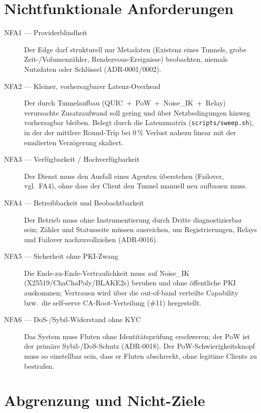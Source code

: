 \section{Nichtfunktionale Anforderungen}\label{sec:nichtfunktionale-anforderungen}

\begin{description}
  \item[NFA1 --- Providerblindheit] Der Edge darf strukturell nur
    Metadaten (Existenz eines Tunnels, grobe Zeit-/Volumenzähler, Rendezvous-Ereignisse)
    beobachten, niemals Nutzdaten oder Schlüssel (ADR-0001/0002).
  \item[NFA2 --- Kleiner, vorhersagbarer Latenz-Overhead] Der durch Tunnelaufbau
    (QUIC~+~PoW~+~Noise\_IK~+~Relay) verursachte Zusatzaufwand soll gering und über
    Netzbedingungen hinweg vorhersagbar bleiben. Belegt durch die Latenzmatrix
    (\texttt{scripts/sweep.sh}), in der der mittlere Round-Trip bei 0\,\% Verlust
    nahezu linear mit der emulierten Verzögerung skaliert.
  \item[NFA3 --- Verfügbarkeit / Hochverfügbarkeit] Der Dienst muss den Ausfall eines
    Agenten überstehen (Failover, vgl.\ FA4), ohne dass der Client den Tunnel manuell
    neu aufbauen muss.
  \item[NFA4 --- Betreibbarkeit und Beobachtbarkeit] Der Betrieb muss ohne
    Instrumentierung durch Dritte diagnostizierbar sein; Zähler und Statusseite müssen
    ausreichen, um Registrierungen, Relays und Failover nachzuvollziehen (ADR-0016).
  \item[NFA5 --- Sicherheit ohne PKI-Zwang] Die Ende-zu-Ende-Vertraulichkeit muss auf
    Noise\_IK (X25519/ChaChaPoly/BLAKE2s) beruhen und ohne öffentliche PKI auskommen;
    Vertrauen wird über die out-of-band verteilte Capability bzw.\ die self-serve
    CA-Root-Verteilung (\#11) hergestellt.
  \item[NFA6 --- DoS-/Sybil-Widerstand ohne KYC] Das System muss Fluten ohne
    Identitätsprüfung erschweren; der PoW ist der primäre Sybil-/DoS-Schutz (ADR-0018).
    Der PoW-Schwierigkeitsknopf muss so einstellbar sein, dass er Fluten abschreckt,
    ohne legitime Clients zu bestrafen.
\end{description}

\section{Abgrenzung und Nicht-Ziele}\label{sec:abgrenzung}

